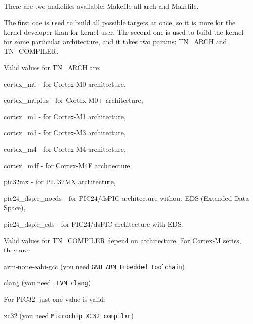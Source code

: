 There are two makefiles available\+: {\ttfamily Makefile-\/all-\/arch} and {\ttfamily Makefile}.

The first one is used to build all possible targets at once, so it is more for the kernel developer than for kernel user. The second one is used to build the kernel for some particular architecture, and it takes two params\+: {\ttfamily T\+N\+\_\+\+A\+R\+C\+H} and {\ttfamily T\+N\+\_\+\+C\+O\+M\+P\+I\+L\+E\+R}.

Valid values for {\ttfamily T\+N\+\_\+\+A\+R\+C\+H} are\+:


\begin{DoxyItemize}
\item {\ttfamily cortex\+\_\+m0} -\/ for Cortex-\/\+M0 architecture,
\item {\ttfamily cortex\+\_\+m0plus} -\/ for Cortex-\/\+M0+ architecture,
\item {\ttfamily cortex\+\_\+m1} -\/ for Cortex-\/\+M1 architecture,
\item {\ttfamily cortex\+\_\+m3} -\/ for Cortex-\/\+M3 architecture,
\item {\ttfamily cortex\+\_\+m4} -\/ for Cortex-\/\+M4 architecture,
\item {\ttfamily cortex\+\_\+m4f} -\/ for Cortex-\/\+M4\+F architecture,
\item {\ttfamily pic32mx} -\/ for P\+I\+C32\+M\+X architecture,
\item {\ttfamily pic24\+\_\+dspic\+\_\+noeds} -\/ for P\+I\+C24/ds\+P\+I\+C architecture without E\+D\+S (Extended Data Space),
\item {\ttfamily pic24\+\_\+dspic\+\_\+eds} -\/ for P\+I\+C24/ds\+P\+I\+C architecture with E\+D\+S.
\end{DoxyItemize}

Valid values for {\ttfamily T\+N\+\_\+\+C\+O\+M\+P\+I\+L\+E\+R} depend on architecture. For Cortex-\/\+M series, they are\+:


\begin{DoxyItemize}
\item {\ttfamily arm-\/none-\/eabi-\/gcc} (you need \href{https://launchpad.net/~terry.guo/+archive/ubuntu/gcc-arm-embedded}{\tt G\+N\+U A\+R\+M Embedded toolchain})
\item {\ttfamily clang} (you need \href{http://clang.llvm.org/}{\tt L\+L\+V\+M clang})
\end{DoxyItemize}

For P\+I\+C32, just one value is valid\+:


\begin{DoxyItemize}
\item {\ttfamily xc32} (you need \href{http://www.microchip.com/xc32}{\tt Microchip X\+C32 compiler})
\end{DoxyItemize}

